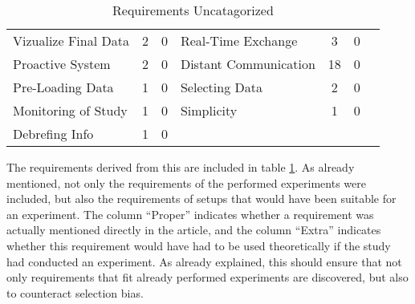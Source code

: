 \begin{table}[htbp]
\begin{tabular}{lcclccc}
    Vizualize Final Data                                       & 2                          & 0                         & Real-Time Exchange                                         & 3                          & 0                         \\
    Proactive System                                           & 2                          & 0                         & Distant Communication                                      & 18                         & 0                         \\
    Pre-Loading Data                                           & 1                          & 0                         & Selecting Data                                              & 2                          & 0                         \\
    Monitoring of Study                                        & 1                          & 0                         & Simplicity                                                  & 1                          & 0                         \\
    Debrefing Info                                             & 1                          & 0                         & & & & \\\hline
    \end{tabular}
    \caption[Requirements Uncatagorized]{Requirements Uncatagorized}\label{tab:requirementsRaw1}
    \end{table}


The requirements derived from this are included in table \ref{tab:requirementsRaw1}. As already mentioned, not only the requirements of the performed experiments were included, but also the requirements of setups that would have been suitable for an experiment. The column \enquote{Proper} indicates whether a requirement was actually mentioned directly in the article, and the column \enquote{Extra} indicates whether this requirement would have had to be used theoretically if the study had conducted an experiment. As already explained, this should ensure that not only requirements that fit already performed experiments are discovered, but also to counteract selection bias.



